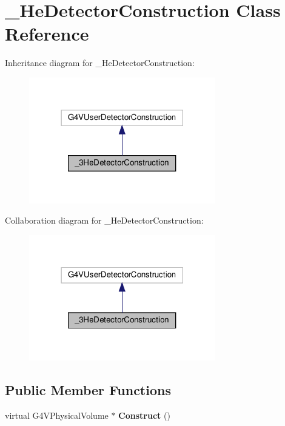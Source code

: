\hypertarget{class__3HeDetectorConstruction}{}\section{\+\_\+He\+Detector\+Construction Class Reference}
\label{class__3HeDetectorConstruction}


Inheritance diagram for \+\_\+He\+Detector\+Construction\+:
\nopagebreak
\begin{figure}[H]
\begin{center}
\leavevmode
\includegraphics[width=230pt]{class__3HeDetectorConstruction__inherit__graph}
\end{center}
\end{figure}


Collaboration diagram for \+\_\+He\+Detector\+Construction\+:
\nopagebreak
\begin{figure}[H]
\begin{center}
\leavevmode
\includegraphics[width=230pt]{class__3HeDetectorConstruction__coll__graph}
\end{center}
\end{figure}
\subsection*{Public Member Functions}
\begin{DoxyCompactItemize}
\item 
\mbox{\label{class__3HeDetectorConstruction_a77db6b8f95650831b38afa06616cbaef}} 
virtual G4\+V\+Physical\+Volume $\ast$ {\bfseries Construct} ()
\end{DoxyCompactItemize}


